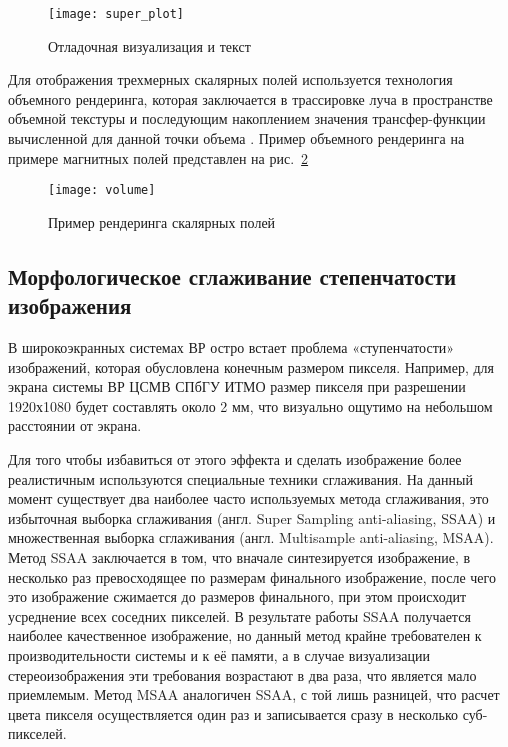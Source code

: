 \begin{figure}[ht]
\begin{center}
\texttt{[image: super\_plot]}
\end{center}
\caption{Отладочная визуализация и текст}
\label{super_plot}
\end{figure}

Для отображения трехмерных скалярных полей используется технология объемного рендеринга, которая 
заключается в трассировке луча в пространстве объемной текстуры и последующим накоплением 
значения трансфер-функции вычисленной для данной точки объема \citep{Engel01high-qualitypre-integrated}.
Пример объемного рендеринга на примере магнитных полей представлен на рис.~\ref{volume}

\begin{figure}[ht]
\begin{center}
\texttt{[image: volume]}
\end{center}
\caption{Пример рендеринга скалярных полей}
\label{volume}
\end{figure}

\subsection{Морфологическое сглаживание степенчатости изображения}
В широкоэкранных системах ВР остро встает проблема «ступенчатости» изображений, которая обусловлена конечным размером пикселя. Например, для экрана системы ВР ЦСМВ СПбГУ ИТМО размер пикселя при разрешении 1920х1080 будет составлять около 2 мм, что визуально ощутимо на небольшом расстоянии от экрана. 

Для того чтобы избавиться от этого эффекта и сделать изображение более реалистичным используются специальные техники сглаживания.
На данный момент существует два наиболее часто используемых метода сглаживания, это избыточная выборка сглаживания (англ. Super Sampling anti-aliasing, SSAA) и множественная выборка сглаживания (англ. Multisample anti-aliasing, MSAA). Метод SSAA заключается в том, что вначале синтезируется изображение, в несколько раз превосходящее по размерам финального изображение, после чего это изображение сжимается до размеров финального, при этом происходит усреднение всех соседних пикселей. В результате работы SSAA получается наиболее качественное изображение, но данный метод крайне требователен к производительности системы и к её памяти, а в случае визуализации стереоизображения эти требования возрастают в два раза, что является мало приемлемым. Метод MSAA аналогичен SSAA, с той лишь разницей, что расчет цвета пикселя осуществляется один раз и записывается сразу в несколько суб-пикселей.

